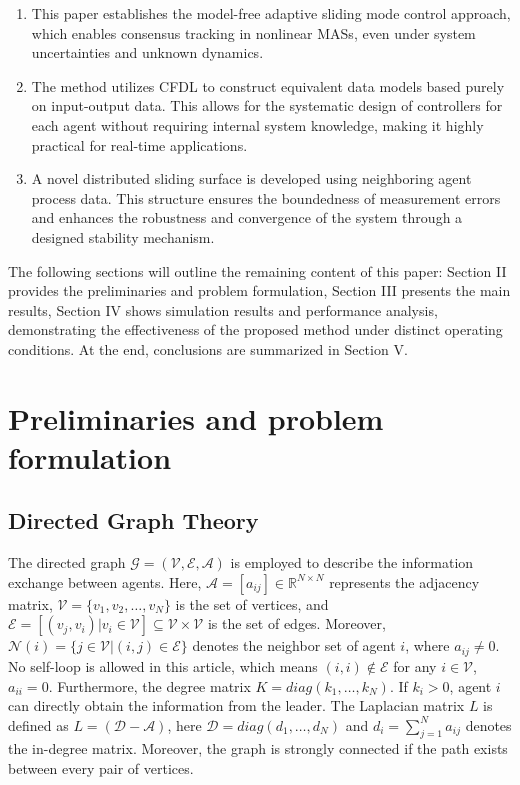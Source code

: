 \documentclass[journal,onecolumn]{IEEEtran}
\begin{document}
\begin{enumerate}

    \item This paper establishes the model-free adaptive sliding mode control approach, which enables consensus tracking in nonlinear MASs, even under system uncertainties and unknown dynamics.
    
    \item The method utilizes CFDL to construct equivalent data models based purely on input-output data. This allows for the systematic design of controllers for each agent without requiring internal system knowledge, making it highly practical for real-time applications.
    
    \item A novel distributed sliding surface is developed using neighboring agent process data. This structure ensures the boundedness of measurement errors and enhances the robustness and convergence of the system through a designed stability mechanism.

\end{enumerate}


    The following sections will outline the remaining content of this paper:
    Section II provides the preliminaries and problem formulation, Section III presents the main results, Section IV shows simulation results and performance analysis, demonstrating the effectiveness of the proposed method under distinct operating conditions. At the end, conclusions are summarized in Section V.


\section{Preliminaries and problem formulation}\label{section:2}
\subsection{Directed Graph Theory}

\indent The directed graph $ \mathcal{G} = (\mathcal{V}, \mathcal{E}, \mathcal{A}) $ is employed to describe the information exchange between agents. Here, $ \mathcal{A} = [a_{ij}] \in \mathbb{R}^{N \times N} $ represents the adjacency matrix, $ \mathcal{V}=\{v_1, v_2,\dots,v_N\} $ is the set of vertices, and $ \mathcal{E} = [(v_j,v_i)|v_i \in \mathcal{V} ] \subseteq \mathcal{V} \times \mathcal{V}$ is the set of edges. Moreover, $ \mathcal{N}(i) = \{j \in \mathcal{V} |(i,j) \in \mathcal{E}\} $ denotes the neighbor set of agent $ i $, where $ a_{i j} \neq 0$. No self-loop is allowed in this article, which means $(i, i) \notin \mathcal{E}$ for any $ i \in \mathcal{V} $, $ a_{ii}=0$. Furthermore, the degree matrix $ K = diag(k_1,\dots,k_N)$. If $ k_i > 0$, agent $ i $ can directly obtain the information from the leader. The Laplacian matrix $ L $ is defined as $ L = (\mathcal{D}-\mathcal{A})$, here $\mathcal{D} = diag({d_1,\dots,d_N})$ and $d_i=\sum_{j=1}^{N} a_{i j}$ denotes the in-degree matrix. Moreover, the graph is strongly connected if the path exists between every pair of vertices.
\end{document}
